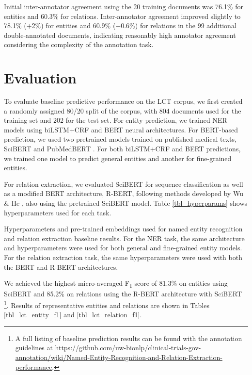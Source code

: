 \documentclass[../main.tex]{subfiles}
\begin{document}
Initial inter-annotator agreement using the 20 training documents was 76.1\% for entities and 60.3\% for relations. Inter-annotator agreement improved slightly to 78.1\% (+2\%) for entities and 60.9\% (+0.6\%) for relations in the 99 additional double-annotated documents, indicating reasonably high annotator agreement considering the complexity of the annotation task.

\section{Evaluation}
To evaluate baseline predictive performance on the LCT corpus, we first created a randomly assigned 80/20 split of the corpus, with 804 documents used for the training set and 202 for the test set. For entity prediction, we trained NER models using biLSTM+CRF and BERT \cite{devlin2018bert} neural architectures. For BERT-based prediction, we used two pretrained models trained on published medical texts, SciBERT \cite{beltagy2019scibert} and PubMedBERT \cite{gu2021domain}. For both biLSTM+CRF and BERT predictions, we trained one model to predict general entities and another for fine-grained entities. 

For relation extraction, we evaluated SciBERT for sequence classification as well as a modified BERT architecture, R-BERT, following methods developed by Wu \& He \cite{wu2019enriching}, also using the pretrained SciBERT model. Table \ref{tbl_hyperparams} shows hyperparameters used for each task.

\def\arraystretch{1.2}
\begin{table}[h!]
  \centering
  \def\arraystretch{1}
  \footnotesize
  
  \caption{Hyperparameters and pre-trained embeddings used for named entity recognition and relation extraction baseline results. For the NER task, the same architecture and hyperparameters were used for both general and fine-grained entity models. For the relation extraction task, the same hyperparameters were used with both the BERT and R-BERT architectures.}
  \label{tbl_hyperparams}
\end{table}

We achieved the highest micro-averaged F\textsubscript{1} score of 81.3\% on entities using SciBERT and 85.2\% on relations using the R-BERT architecture with SciBERT \footnote{A full listing of baseline prediction results can be found with the annotation guidelines at \url{https://github.com/uw-bionlp/clinical-trials-gov-annotation/wiki/Named-Entity-Recognition-and-Relation-Extraction-performance}. }. Results of representative entities and relations are shown in Tables \ref{tbl_lct_entity_f1} and \ref{tbl_lct_relation_f1}.
\end{document}
